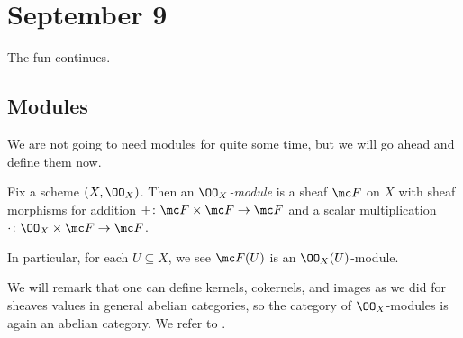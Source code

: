 \documentclass[../notes.tex]{subfiles}
\begin{document}
\section{September 9}

The fun continues.

\subsection{Modules}
We are not going to need modules for quite some time, but we will go ahead and define them now.
\begin{definition}[Module]
	Fix a scheme $(X,\OO_X)$. Then an \textit{$\OO_X$-module} is a sheaf $\mc F$ on $X$ with sheaf morphisms for addition $+\colon\mc F\times\mc F\to\mc F$ and a scalar multiplication $\cdot\colon\OO_X\times\mc F\to\mc F$.
\end{definition}
\begin{remark}
	In particular, for each $U\subseteq X$, we see $\mc F(U)$ is an $\OO_X(U)$-module.
\end{remark}
We will remark that one can define kernels, cokernels, and images as we did for sheaves values in general abelian categories, so the category of $\OO_X$-modules is again an abelian category. We refer to \cite[\S2.6.3]{rising-sea}.
\end{document}
